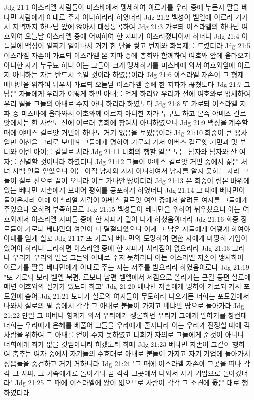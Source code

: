 Jdg 21:1  이스라엘 사람들이 미스바에서 맹세하여 이르기를 우리 중에 누든지 딸을 베냐민 사람에게 아내로 주지 아니하리라 하였더라
Jdg 21:2  백성이 벧엘에 이르러 거기서 저녁까지 하나님 앞에 앉아서 대성통곡하여
Jdg 21:3  가로되 이스라엘의 하나님 여호와여 오늘날 이스라엘 중에 어찌하여 한 지파가 이즈러졌나이까 하더니
Jdg 21:4  이튿날에 백성이 일찌기 일어나서 거기 한 단을 쌓고 번제와 화목제를 드렸더라
Jdg 21:5  이스라엘 자손이 가로되 이스라엘 온 지파 중에 총회와 함께하여 여호와 앞에 올라오지 아니한 자가 누구뇨 하니 이는 그들이 크게 맹세하기를 미스바에 와서 여호와앞에 이르지 아니하는 자는 반드시 죽일 것이라 하였음이라
Jdg 21:6  이스라엘 자손이 그 형제 베냐민을 위하여 뉘우쳐 가로되 오늘날 이스라엘 중에 한 지파가 끊쳤도다
Jdg 21:7  그 남은 자들에게 우리가 어떻게 하면 아내를 얻게 하리요 우리가 전에 여호와로 맹세하여 우리 딸을 그들의 아내로 주지 아니 하리라 하였도다
Jdg 21:8  또 가로되 이스라엘 지파 중 미스바에 올라와서 여호와께 이르지 아니한 자가 누구뇨 하고 본즉 야베스 길르앗에서는 한 사람도 진에 이르러 총회에 참여치 아니하였으니
Jdg 21:9  백성을 계수할 때에 야베스 길르앗 거민이 하나도 거기 없음을 보았음이라
Jdg 21:10  회중이 큰 용사 일만 이천을 그리로 보내며 그들에게 명하여 가로되 가서 야베스 길르앗 거민과 및 부녀와 어린 아이를 칼날로 치라
Jdg 21:11  너희의 행할 일은 모든 남자와 남자와 잔 여자를 진멸할 것이니라 하였더니
Jdg 21:12  그들이 야베스 길르앗 거민 중에서 젊은 처녀 사백 인을 얻었으니 이는 아직 남자와 자지 아니하여서 남자를 알지 못하는 자라 그들이 실로 진으로 끌어 오니라 이는 가나안 땅이더라
Jdg 21:13  온 회중이 림몬 바위에 있는 베냐민 자손에게 보내어 평화를 공포하게 하였더니
Jdg 21:14  그 때에 베냐민이 돌아온지라 이에 이스라엘 사람이 야베스 길르앗 여인 중에서 살려둔 여자를 그들에게 주었으나 오히려 부족하므로
Jdg 21:15  백성들이 베냐민을 위하여 뉘우쳤으니 이는 여호와께서 이스라엘 지파들 중에 한 지파가 궐이 나게 하셨음이더라
Jdg 21:16  회중 장로들이 가로되 베냐민의 여인이 다 멸절되었으니 이제 그 남은 자들에게 어떻게 하여야 아내를 얻게 할꼬
Jdg 21:17  또 가로되 베냐민의 도망하여 면한 자에게 마땅히 기업이 있어야 하리니 그리하면 이스라엘 중에 한 지파가 사라짐이 없으리라
Jdg 21:18  그러나 우리가 우리의 딸을 그들의 아내로 주지 못하리니 이는 이스라엘 자손이 맹세하여 이르기를 딸을 베냐민에게 아내로 주는 자는 저주를 받으리라 하였음이로다
Jdg 21:19  "또 가로되 보라 벧엘 북편, 르보나 남편 벧엘에서 세겜으로 올라가는 큰길 동편 실로에 매년 여호와의 절기가 있도다 하고"
Jdg 21:20  베냐민 자손에게 명하여 가로되 가서 포도원에 숨어
Jdg 21:21  보다가 실로의 여자들이 무도하러 나오거든 너희는 포도원에서 나와서 실로의 딸 중에서 각각 그 아내로 붙들어 가지고 베냐민 땅으로 돌아가라
Jdg 21:22  만일 그 아비나 형제가 와서 우리에게 쟁론하면 우리가 그에게 말하기를 청컨대 너희는 우리에게 은혜를 베풀어 그들을 우리에게 줄지니라 이는 우리가 전쟁할 때에 각 사람을 위하여 그 아내를 얻어 주지 못하였고 너희가 자의로 그들에게 준것이 아니니 너희에게 죄가 없을 것임이니라 하겠노라 하매
Jdg 21:23  베냐민 자손이 그같이 행하여 춤추는 여자 중에서 자기들의 수효대로 아내로 붙들어 가지고 자기 기업에 돌아가서 성읍들을 중건하고 거기 거하니라
Jdg 21:24  "그 때에 이스라엘 자손이 그곳을 떠나 각각 그 지파, 그 가족에게로 돌아가되 곧 각각 그곳에서 나와서 자기 기업으로 돌아갔더라"
Jdg 21:25  그 때에 이스라엘에 왕이 없으므로 사람이 각각 그 소견에 옳은 대로 행하였더라


